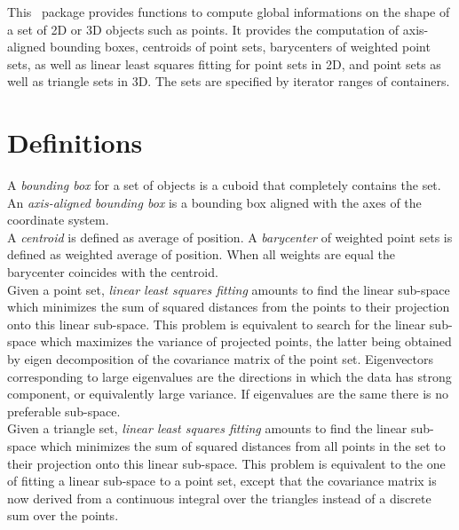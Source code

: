 This \cgal\ package provides functions to compute global informations
on the shape of a set of 2D or 3D objects such as points. It provides the computation of axis-aligned bounding boxes, centroids of point sets, barycenters of weighted point sets, as well as linear least squares fitting for point sets in 2D, and point sets as well as triangle sets in 3D. The sets are specified by iterator ranges of containers.\\

\section{Definitions}

A \emph{bounding box} for a set of objects is a cuboid that completely
contains the set. An \emph{axis-aligned bounding box} is a bounding box
aligned with the axes of the coordinate system.\\

A \emph{centroid} is defined as average of position. A \emph{barycenter} of weighted point sets is defined as weighted average of position. When all weights are equal the barycenter coincides with the centroid.\\

Given a point set, \emph{linear least squares fitting} amounts to
find the linear sub-space which minimizes the sum of squared
distances from the points to their projection onto this linear
sub-space. This problem is equivalent to search for the linear
sub-space which maximizes the variance of projected points, the latter
being obtained by eigen decomposition of the covariance
matrix of the point set. Eigenvectors corresponding to large eigenvalues are the
directions in which the data has strong component, or equivalently
large variance. If eigenvalues are the same there is no preferable
sub-space.\\

Given a triangle set, \emph{linear least squares fitting} amounts to find the linear sub-space which minimizes the sum of squared
distances from all points in the set to their projection onto this linear
sub-space. This problem is equivalent to the one of fitting a linear sub-space to a point set, except that the covariance matrix is now derived from a continuous integral over the triangles instead of a discrete sum over the points.


